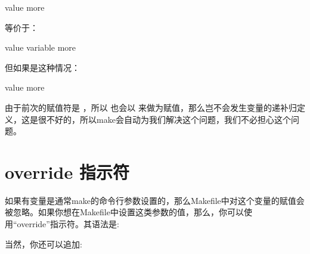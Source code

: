 \documentclass[a4paper,10pt]{sphinxmanual}
\begin{document}
\begin{sphinxVerbatim}[commandchars=\\\{\}]
  value
  more
\end{sphinxVerbatim}

等价于：

\begin{sphinxVerbatim}[commandchars=\\\{\}]
  value
  variable more
\end{sphinxVerbatim}

但如果是这种情况：

\begin{sphinxVerbatim}[commandchars=\\\{\}]
  value
  more
\end{sphinxVerbatim}

由于前次的赋值符是 \sphinxcode{\sphinxupquote{=}} ，所以 \sphinxcode{\sphinxupquote{+=}} 也会以 \sphinxcode{\sphinxupquote{=}} 来做为赋值，那么岂不会发生变量的递补归定义，这是很不好的，所以make会自动为我们解决这个问题，我们不必担心这个问题。


\section{override 指示符}
\label{\detokenize{variables:override}}
如果有变量是通常make的命令行参数设置的，那么Makefile中对这个变量的赋值会被忽略。如果你想在Makefile中设置这类参数的值，那么，你可以使用“override”指示符。其语法是:

\begin{sphinxVerbatim}[commandchars=\\\{\}]
   

   
\end{sphinxVerbatim}

当然，你还可以追加:

\begin{sphinxVerbatim}[commandchars=\\\{\}]
    
\end{sphinxVerbatim}
\end{document}
